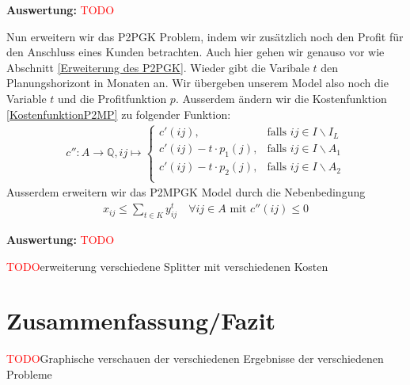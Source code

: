 \documentclass[11pt,a4paper]{article}
\newcommand{\Q}{\mathbb{Q}}
\newcommand{\TODO}{\textcolor{red}{TODO}}
\theoremstyle{my_th_style1}
\begin{document}
 \textbf{Auswertung:} \TODO
 
  
Nun erweitern wir das P2PGK Problem, indem wir zusätzlich noch den Profit für den Anschluss eines Kunden  betrachten.
 Auch hier gehen wir genauso vor wie Abschnitt \ref{Erweiterung des P2PGK}.  Wieder gibt die Varibale  $t$  den Planungshorizont in Monaten an. Wir \"ubergeben unserem Model also noch die Variable $t$ und die Profitfunktion $p$. Ausserdem \"andern wir die Kostenfunktion \eqref{KostenfunktionP2MP}  zu folgender Funktion:
 \begin{align*}
  c'': A  \rightarrow \Q,  ij  \mapsto \left\{\begin{array}{cl} 
 c'(ij), & \text{falls } ij \in I\backslash I_L \\ 
  c'(ij) -t  \cdot p_1(j), & \text{falls } ij \in I\backslash A_1 \\ 
    c'(ij) -t \cdot p_2(j), & \text{falls } ij \in I\backslash A_2 \\ 
\end{array}  \right.
 \end{align*}
 Ausserdem erweitern wir das P2MPGK Model durch die Nebenbedingung 
 \begin{align*}
 x_{ij} \leq \displaystyle\sum_{t \in K} y_{ij}^t \quad \forall ij \in A \text{ mit } c''(ij) \leq 0
 \end{align*}
 
 \textbf{Auswertung:} \TODO
 
 \TODO erweiterung verschiedene Splitter mit verschiedenen Kosten
 
 \section{Zusammenfassung/Fazit}
 \TODO Graphische verschauen der verschiedenen Ergebnisse der verschiedenen Probleme
 
 
\end{document}
